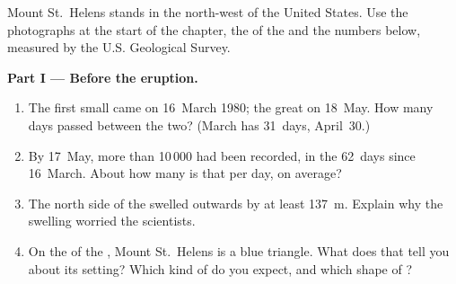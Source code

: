 \begin{problem}
\label{pb:g7:volcanoes:1}

Mount St.~Helens stands in the north-west of the United States. Use the
photographs at the start of the chapter, the  of the  and the
numbers below, measured by the U.S. Geological Survey.

\medskip
\noindent\textbf{Part I --- Before the eruption.}
\begin{enumerate}
  \item The first small  came on 16~March 1980; the great
         on 18~May. How many days passed between the two? (March
        has 31~days, April~30.)
  \item By 17~May, more than 10\,000  had been recorded,
        in the 62~days since 16~March. About how many is that per day, on
        average?
  \item The north side of the  swelled outwards by at least
        \qty{137}{m}. Explain why the swelling worried the scientists.
  \item On the  of the , Mount St.~Helens is a blue triangle.
        What does that tell you about its setting? Which kind of 
        do you expect, and which shape of ?
\end{enumerate}


\end{problem}

